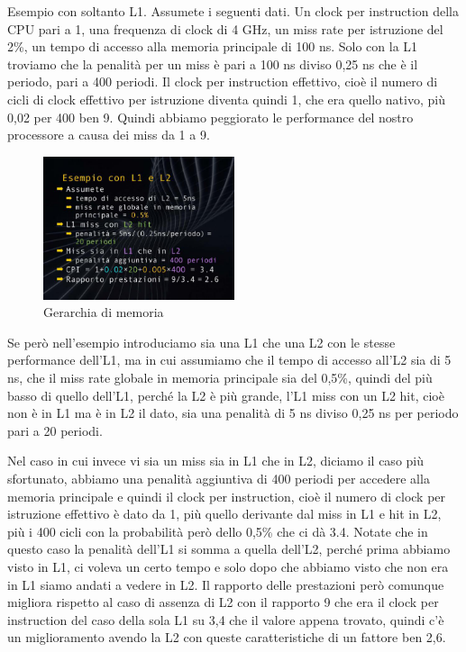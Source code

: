 Esempio con soltanto L1.
Assumete i seguenti dati.
Un clock per instruction della CPU pari a 1, una frequenza di clock di 4 GHz, un miss rate per istruzione del 2\%, un tempo di accesso alla memoria principale di 100 ns.
Solo con la L1 troviamo che la penalità per un miss è pari a 100 ns diviso 0,25 ns che è il periodo, pari a 400 periodi.
Il clock per instruction effettivo, cioè il numero di cicli di clock effettivo per istruzione diventa quindi 1, che era quello nativo, più 0,02 per 400 ben 9.
Quindi abbiamo peggiorato le performance del nostro processore a causa dei miss da 1 a 9.

\FloatBarrier
\begin{figure}[H]
  \centering
  \includegraphics[width=0.50\textwidth,
                    trim=20 20 10 20, %
                    clip]
                    {images/Lez06_p05_fig_05}
  \caption{Gerarchia di memoria}
  \label{fig:Lez06_p05_fig_05}
\end{figure}
\FloatBarrier
\noindent

Se però nell'esempio introduciamo sia una L1 che una L2 con le stesse performance dell'L1, ma in cui assumiamo che il tempo di accesso all'L2 sia di 5 ns, che il miss rate globale in memoria principale sia del 0,5\%, quindi del più basso di quello dell'L1, perché la L2 è più grande, l'L1 miss con un L2 hit, cioè non è in L1 ma è in L2 il dato, sia una penalità di 5 ns diviso 0,25 ns per periodo pari a 20 periodi.

Nel caso in cui invece vi sia un miss sia in L1 che in L2, diciamo il caso più sfortunato, abbiamo una penalità aggiuntiva di 400 periodi per accedere alla memoria principale e quindi il clock per instruction, cioè il numero di clock per istruzione effettivo è dato da 1, più quello derivante dal miss in L1 e hit in L2, più i 400 cicli con la probabilità però dello 0,5\% che ci dà 3.4.
Notate che in questo caso la penalità dell'L1 si somma a quella dell'L2, perché prima abbiamo visto in L1, ci voleva un certo tempo e solo dopo che abbiamo visto che non era in L1 siamo andati a vedere in L2.
Il rapporto delle prestazioni però comunque migliora rispetto al caso di assenza di L2 con il rapporto 9 che era il clock per instruction del caso della sola L1 su 3,4 che il valore appena trovato, quindi c'è un miglioramento avendo la L2 con queste caratteristiche di un fattore ben 2,6.

